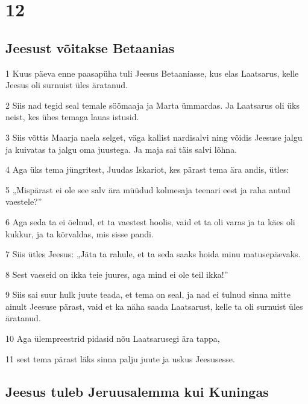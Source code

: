 \chapter{12}

\section*{Jeesust võitakse Betaanias}

\par 1 Kuus päeva enne paasapüha tuli Jeesus Betaaniasse, kus elas Laatsarus, kelle Jeesus oli surnuist üles äratanud.
\par 2 Siis nad tegid seal temale söömaaja ja Marta ümmardas. Ja Laatsarus oli üks neist, kes ühes temaga lauas istusid.
\par 3 Siis võttis Maarja naela selget, väga kallist nardisalvi ning võidis Jeesuse jalgu ja kuivatas ta jalgu oma juustega. Ja maja sai täis salvi lõhna.
\par 4 Aga üks tema jüngritest, Juudas Iskariot, kes pärast tema ära andis, ütles:
\par 5 „Mispärast ei ole see salv ära müüdud kolmesaja teenari eest ja raha antud vaestele?”
\par 6 Aga seda ta ei öelnud, et ta vaestest hoolis, vaid et ta oli varas ja ta käes oli kukkur, ja ta kõrvaldas, mis sisse pandi.
\par 7 Siis ütles Jeesus: „Jäta ta rahule, et ta seda saaks hoida minu matusepäevaks.
\par 8 Sest vaeseid on ikka teie juures, aga mind ei ole teil ikka!”
\par 9 Siis sai suur hulk juute teada, et tema on seal, ja nad ei tulnud sinna mitte ainult Jeesuse pärast, vaid et ka näha saada Laatsarust, kelle ta oli surnuist üles äratanud.
\par 10 Aga ülempreestrid pidasid nõu Laatsarusegi ära tappa,
\par 11 sest tema pärast läks sinna palju juute ja uskus Jeesusesse.

\section*{Jeesus tuleb Jeruusalemma kui Kuningas}

